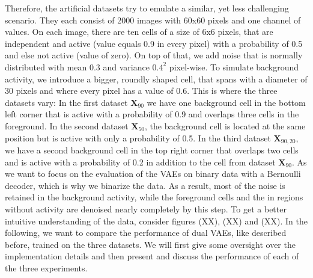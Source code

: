 \documentclass[12pt]{report}
\theoremstyle{definition}
\begin{document}
Therefore, the artificial datasets try to emulate a similar, yet less challenging scenario. They each consist of 2000 images with 60x60 pixels and one channel of values. On each image, there are ten cells of a size of 6x6 pixels, that are independent and active (value equals 0.9 in every pixel) with a probability of 0.5 and else not active (value of zero). On top of that, we add noise that is normally distributed with mean $0.3$ and variance $0.4^2$ pixel-wise. To simulate background activity, we introduce a bigger, roundly shaped cell, that spans with a diameter of 30 pixels and where every pixel has a value of 0.6. This is where the three datasets vary: In the first dataset $\mathbf{X}_{90}$ we have one background cell in the bottom left corner that is active with a probability of 0.9 and overlaps three cells in the foreground. In the second dataset $\mathbf{X}_{50}$, the background cell is located at the same position but is active with only a probability of 0.5. In the third dataset $\mathbf{X}_{90, 20}$, we have a second background cell in the top right corner that overlaps two cells and is active with a probability of 0.2 in addition to the cell from dataset $\mathbf{X}_{90}$. As we want to focus on the evaluation of the VAEs on binary data with a Bernoulli decoder, which is why we binarize the data. As a result, most of the noise is retained in the background activity, while the foreground cells and the  in regions without activity are denoised nearly completely by this step. To get a better intuitive understanding of the data, consider figures (XX), (XX) and (XX). In the following, we want to compare the performance of dual VAEs, like described before, trained on the three datasets. We will first give some oversight over the implementation details and then present and discuss the performance of each of the three experiments.
\end{document}
